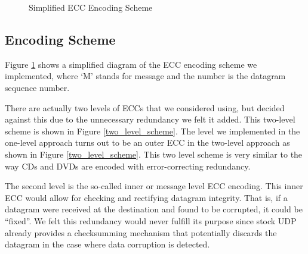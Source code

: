 \documentclass[conference]{IEEEtran}
\theoremstyle{definition}
\begin{document}
\begin{figure}[t!]                                                          %
\centering                                                                  %
\resizebox{0.4\textwidth}{!}{}
\caption{Simplified ECC Encoding Scheme}                                    %
\label{simplified_ecc_scheme}                                               %
\end{figure}                                                                %

\subsection{Encoding Scheme}

Figure \ref{simplified_ecc_scheme}
shows a simplified diagram of the ECC encoding scheme we implemented,
where `M' stands for message and the number is the datagram
sequence number.

There are actually two levels of ECCs that we considered using,
but decided against this due to the unnecessary redundancy
we felt it added.  This two-level scheme is shown in Figure
\ref{two_level_scheme}.  The level we implemented in the
one-level approach turns out to be an outer ECC in the
two-level approach as shown in Figure \ref{two_level_scheme}.
This two level scheme is very similar to the way CDs and DVDs
are encoded with error-correcting redundancy\cite{kou2001low}.

The second level is the so-called inner or message level
ECC encoding.  This inner ECC would allow for checking and
rectifying datagram integrity.  That is, if a datagram were
received at the destination and found to be corrupted, it could
be ``fixed''.  We felt this redundancy would never fulfill
its purpose since stock UDP already provides a checksumming
mechanism that potentially discards the datagram in the case
where data corruption is detected.
\end{document}
